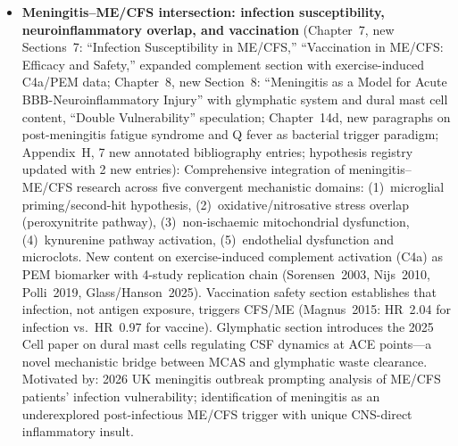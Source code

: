 \begin{itemize}
  \item \textbf{Meningitis--ME/CFS intersection: infection susceptibility, neuroinflammatory overlap, and vaccination}
    (Chapter~7, new Sections~7: ``Infection Susceptibility in ME/CFS,''
    ``Vaccination in ME/CFS: Efficacy and Safety,'' expanded complement
    section with exercise-induced C4a/PEM data;
    Chapter~8, new Section~8: ``Meningitis as a Model for Acute
    BBB-Neuroinflammatory Injury'' with glymphatic system and dural mast cell
    content, ``Double Vulnerability'' speculation;
    Chapter~14d, new paragraphs on post-meningitis fatigue syndrome and
    Q fever as bacterial trigger paradigm;
    Appendix~H, 7 new annotated bibliography entries;
    hypothesis registry updated with 2 new entries):
    Comprehensive integration of meningitis--ME/CFS research across five
    convergent mechanistic domains: (1)~microglial priming/second-hit hypothesis,
    (2)~oxidative/nitrosative stress overlap (peroxynitrite pathway),
    (3)~non-ischaemic mitochondrial dysfunction, (4)~kynurenine pathway
    activation, (5)~endothelial dysfunction and microclots. New content on
    exercise-induced complement activation (C4a) as PEM biomarker with
    4-study replication chain (Sorensen~2003, Nijs~2010, Polli~2019,
    Glass/Hanson~2025). Vaccination safety section establishes that infection,
    not antigen exposure, triggers CFS/ME (Magnus~2015: HR~2.04 for infection
    vs.\ HR~0.97 for vaccine). Glymphatic section introduces the 2025 Cell
    paper on dural mast cells regulating CSF dynamics at ACE points---a novel
    mechanistic bridge between MCAS and glymphatic waste clearance.
    Motivated by: 2026 UK meningitis outbreak prompting analysis of ME/CFS
    patients' infection vulnerability; identification of meningitis as an
    underexplored post-infectious ME/CFS trigger with unique CNS-direct
    inflammatory insult.
    \cite{Hotopf1996meningitis,Schwitter2024meningitis,Ungureanu2021meningitis,%
    Magnus2009meningococcal,Magnus2015influenza,Prinsen2012vaccine,%
    Sorensen2003complement,Nijs2010pem,Polli2019complement,Glass2025ev,%
    iu2024tcell_exhaustion,Spronk2023qfever,Pinas2022glymphatic,%
    Christodoulides2024meningitis,Caligiuri1987nk,Scheld1999oxidative,%
    Schwerk2015meningitis,VanderLinden2023microclots,Perrin2025glymphatic,%
    Midtbo2014meningitis,Gil2023cd8,Klein2024longcovid,Bested2001bbb}


\end{itemize}
